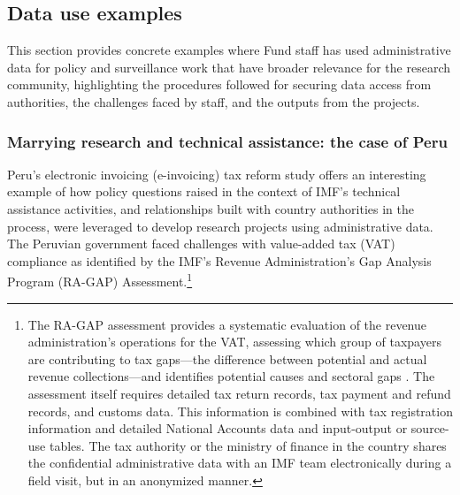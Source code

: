 \hypertarget{data-use-examples-7}{%
\subsection{Data use examples}\label{data-use-examples-7}}

This section provides concrete examples where Fund staff has used administrative data for policy and surveillance work that have broader relevance for the research community, highlighting the procedures followed for securing data access from authorities, the challenges faced by staff, and the outputs from the projects.

\hypertarget{marrying-research-and-technical-assistance-the-case-of-peru}{%
\subsubsection{Marrying research and technical assistance: the case of Peru}\label{marrying-research-and-technical-assistance-the-case-of-peru}}

Peru's electronic invoicing (e-invoicing) tax reform study offers an interesting example of how policy questions raised in the context of IMF's technical assistance activities, and relationships built with country authorities in the process, were leveraged to develop research projects using administrative data. The Peruvian government faced challenges with value-added tax (VAT) compliance as identified by the IMF's Revenue Administration's Gap Analysis Program (RA-GAP) Assessment.\footnote{The RA-GAP assessment provides a systematic evaluation of the revenue administration's operations for the VAT, assessing which group of taxpayers are contributing to tax gaps---the difference between potential and actual revenue collections---and identifies potential causes and sectoral gaps \citep{hutton2017}. The assessment itself requires detailed tax return records, tax payment and refund records, and customs data. This information is combined with tax registration information and detailed National Accounts data and input-output or source-use tables. The tax authority or the ministry of finance in the country shares the confidential administrative data with an IMF team electronically during a field visit, but in an anonymized manner.}

